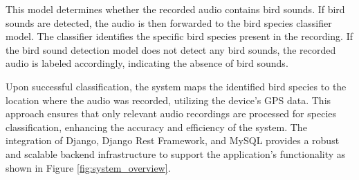 This model determines whether
the recorded audio contains bird sounds. If bird sounds are detected, the audio
is then forwarded to the bird species classifier model. The classifier
identifies the specific bird species present in the recording. If the bird sound detection model does not detect any bird
sounds, the recorded audio is labeled accordingly, indicating the absence of
bird sounds.

Upon successful classification, the system maps the identified bird species to
the location where the audio was recorded, utilizing the device's GPS data.
This approach ensures that only relevant audio recordings are processed for
species classification, enhancing the accuracy and efficiency of the system.
The integration of Django, Django Rest Framework, and MySQL provides a robust
and scalable backend infrastructure to support the application's functionality
as shown in Figure \ref{fig:system_overview}.
